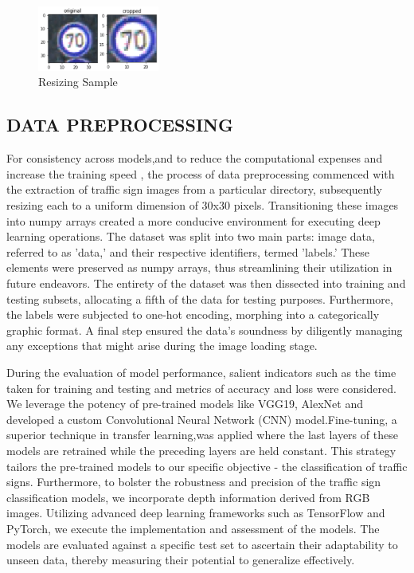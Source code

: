 \documentclass[conference]{IEEEtran}
\begin{document}
\begin{figure}[htp]
    \centering
    \includegraphics[width=4cm]{images/Screenshot 2023-05-22 104652.png}
    \caption{Resizing Sample}
    \label{fig:galaxy}
\end{figure}
\subsection{DATA PREPROCESSING}\label{AA}
For consistency across models,and to reduce the computational expenses and increase the training speed , the process of data preprocessing commenced with the extraction of traffic sign images from a particular directory, subsequently resizing each to a uniform dimension of 30x30 pixels. 
Transitioning these images into numpy arrays created a more conducive environment for executing deep learning operations. The dataset was split into two main parts: image data, referred to as 'data,' and their respective identifiers, termed 'labels.' These elements were preserved as numpy arrays, thus streamlining their utilization in future endeavors. The entirety of the dataset was then dissected into training and testing subsets, allocating a fifth of the data for testing purposes. Furthermore, the labels were subjected to one-hot encoding, morphing into a categorically graphic format. A final step ensured the data's soundness by diligently managing any exceptions that might arise during the image loading stage.

During the evaluation of model performance, salient indicators such as the time taken for training and testing and metrics of accuracy and loss were considered. We leverage the potency of pre-trained models like VGG19, AlexNet and developed a custom Convolutional Neural Network (CNN) model.Fine-tuning, a superior technique in transfer learning,was applied where the last layers of these models are retrained while the preceding layers are held constant. This strategy tailors the pre-trained models to our specific objective - the classification of traffic signs. Furthermore, to bolster the robustness and precision of the traffic sign classification models, we incorporate depth information derived from RGB images. Utilizing advanced deep learning frameworks such as TensorFlow and PyTorch, we execute the implementation and assessment of the models. The models are evaluated against a specific test set to ascertain their adaptability to unseen data, thereby measuring their potential to generalize effectively.
\end{document}
